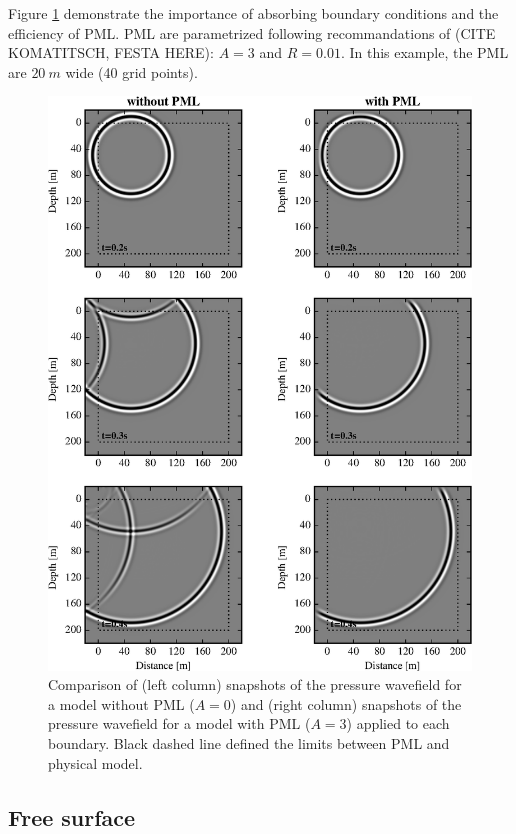 \documentclass{gnulike}
\begin{document}
\noindent Figure \ref{fig:validation-pml} demonstrate the importance of absorbing boundary conditions and the efficiency of PML. PML are parametrized following recommandations of (CITE KOMATITSCH, FESTA HERE): $A=3$ and $R=0.01$. In this example, the PML are $20\ m$ wide (40 grid points).
\begin{figure}[!ht]
  \centering
  \includegraphics[scale=1.0]{fig/validation_pml.eps}
  \caption{Comparison of (left column) snapshots of the pressure wavefield for a model without PML ($A=0$) and (right column) snapshots of the pressure wavefield for a model with PML ($A=3$) applied to each boundary. Black dashed line defined the limits between PML and physical model.}
  \label{fig:validation-pml}
\end{figure}

\subsection{Free surface}
\end{document}
